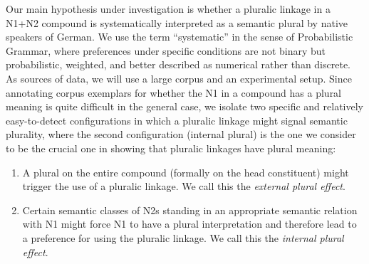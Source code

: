 Our main hypothesis under investigation is whether a pluralic linkage in a N1+N2 compound is systematically interpreted as a semantic plural by native speakers of German.
We use the term ``systematic'' in the sense of Probabilistic Grammar, where preferences under specific conditions are not binary but probabilistic, weighted, and better described as numerical rather than discrete.
As sources of data, we will use a large corpus and an experimental setup.
Since annotating corpus exemplars for whether the N1 in a compound has a plural meaning is quite difficult in the general case, we isolate two specific and relatively easy-to-detect configurations in which a pluralic linkage might signal semantic plurality, where the second configuration (internal plural) is the one we consider to be the crucial one in showing that pluralic linkages have plural meaning:

\vspace{\baselineskip}

\begin{enumerate}
  \item A plural on the entire compound (formally on the head constituent) might trigger the use of a pluralic linkage.
  We call this the \textit{external plural effect}.
  \item Certain semantic classes of N2s standing in an appropriate semantic relation with N1 might force N1 to have a plural interpretation and therefore lead to a preference for using the pluralic linkage.
  We call this the \textit{internal plural effect}.
\end{enumerate}

\vspace{\baselineskip}

